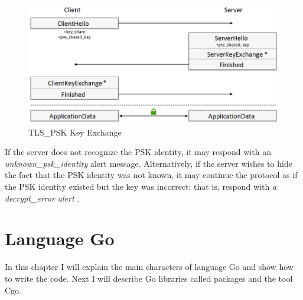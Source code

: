 \documentclass[
  digital, %
  notable,   %
  lof,     %
  lot,     %
]{fithesis3}
\begin{document}
\begin{figure}[th]
	\centering
  	\includegraphics[width=1\textwidth]{psk-edited}%
   \caption{TLS\_PSK Key Exchange}
\end{figure}

If the server does not recognize the PSK identity, it may respond with an 
\textit{unknown\_psk\_identity} alert message.  Alternatively, if the server wishes to hide 
the fact that the PSK identity was not known, it may continue the protocol as if the PSK 
identity existed but the key was incorrect: that is, respond with \textit{a decrypt\_error 
alert} \cite{eronen2005pre}. 

\chapter{Language Go}\label{go}
In this chapter I will explain the main characters of language Go and show how to write the 
code. Next I will describe Go libraries called packages and the tool Cgo.
\end{document}
